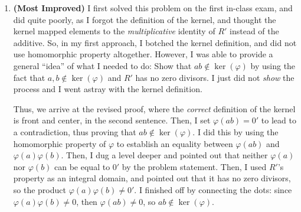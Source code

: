 \documentclass[12pt, oneside]{book}
\begin{document}
\begin{enumerate}[label=\textbf{\arabic*.}]
    \item \textbf{(Most Improved)} I first solved this problem on the first in-class exam, and did quite poorly, as I forgot the definition of the kernel, and thought the kernel mapped elements to the \textit{multiplicative} identity of \(R'\) instead of the additive. So, in my first approach, I botched the kernel definition, and did not use homomorphic property altogether. However, I was able to provide a general ``idea'' of what I needed to do: Show that \(ab \notin \ker(\varphi)\) by using the fact that \(a,b \notin \ker(\varphi)\) and \(R'\) has no zero divisors. I just did not \textit{show} the process and I went astray with the kernel definition. 
    
    Thus, we arrive at the revised proof, where the \textit{correct} definition of the kernel is front and center, in the second sentence. Then, I set \(\varphi(ab) = 0'\) to lead to a contradiction, thus proving that \(ab \notin \ker(\varphi)\). I did this by using the homomorphic property of \(\varphi\) to establish an equality between \(\varphi(ab)\) and \(\varphi(a)\varphi(b)\). Then, I dug a level deeper and pointed out that neither \(\varphi(a)\) nor \(\varphi(b)\) can be equal to \(0'\) by the problem statement. Then, I used \(R'\)'s property as an integral domain, and pointed out that it has no zero divisors, so the product \(\varphi(a)\varphi(b) \ne 0'\). I finished off by connecting the dots: since \(\varphi(a)\varphi(b) \ne 0\), then \(\varphi(ab) \ne 0\), so \(ab \notin \ker(\varphi)\). 
    

\end{enumerate}
\end{document}

